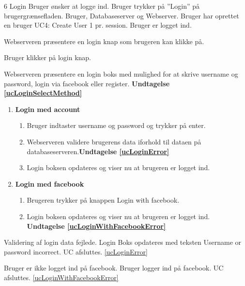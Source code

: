 
\uchead
	{6}
	{Login}
	{Bruger ønsker at logge ind.}
	{Bruger trykker på ''Login'' på brugergrænsefladen.}
	{Bruger, Databaseserver og Webserver.}
	{Bruger har oprettet en bruger} %
	{UC4: Create User}
	{1 pr. session.}
	{Bruger er logget ind.}	
  
		
\item\label{ucLoginPresentBox} Webserveren præsentere en login knap som brugeren kan klikke på.

\item Bruger klikker på login knap.

\item\label{ucLoginSelectMethod} Webserveren præsentere en login boks med mulighed for at skrive username og password, login via facebook eller register. \textbf{Undtagelse \ref{ucLoginSelectMethod}}

\begin{enumerate}

\item \textbf{Login med account}

	\begin{enumerate}
	
		\item Bruger indtaster username og password og trykker på enter.
		\item \label{ucLoginError}Webserveren validere brugerens data iforhold til dataen på databaseserveren.\textbf{Undtagelse \ref{ucLoginError}}
		
		\item Login boksen opdateres og viser nu at brugeren er logget ind.
	
		
	\end{enumerate}


\item \textbf{Login med facebook}
	
	\begin{enumerate}
		\item Brugeren trykker på knappen Login with facebook.
		
		\item\label{ucLoginWithFacebookError} Login boksen opdateres og viser nu at brugeren er logget ind. \textbf{Undtagelse \ref{ucLoginWithFacebookError}}
				
	\end{enumerate}
\end{enumerate}
\ucdescriptionend %
	\ucextension
	{Validering af login data fejlede. Login Boks opdateres med teksten Username or password incorrect.}
	{UC afsluttes.}
	{\ref{ucLoginError}}

\ucextension
	{Bruger er ikke logget ind på facebook. Bruger logger ind på facebook.}
	{UC afsluttes.}
	{\ref{ucLoginWithFacebookError}}


